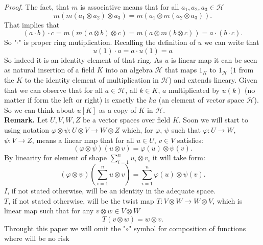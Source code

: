 \documentclass[a4paper]{article}
\begin{document}
\textit{Proof.} The fact, that $m$ is associative means that for all $a_1, a_2, a_3 \in \mathcal{H}$
\begin{equation*}
m(m(a_1 \otimes a_2) \otimes a_3) = m(a_1 \otimes m(a_2 \otimes a_3)).
\end{equation*}
That implies that
\begin{equation*}
(a\cdot b) \cdot c = m(m(a \otimes b) \otimes c) = m(a \otimes m(b \otimes c)) = a \cdot (b \cdot c).
\end{equation*}
So "$\cdot$" is proper ring mutiplication. Recalling the definition of $u$ we can write that
\begin{equation*}
u(1) \cdot a = a \cdot u(1) = a
\end{equation*}
So indeed it is an identity
element of that ring. As $u$ is linear map it can be seen as natural insertion of a field $K$ into an algebra
$\mathcal{H}$ that maps $1_K$ to $1_\mathcal{H}$ ($1$ from the $K$ to the identity element of multiplication
in $\mathcal{H}$) and extends lineary. Given that we can observe
that for all $a \in \mathcal{H}$, all $k \in K$, $a$ multiplicated by $u(k)$ (no matter if form the left
or right) is exactly the $ka$ (an element of vector space $\mathcal{H}$).
So we can think about $u[K]$ as a copy of $K$ in $\mathcal{H}$.
\\[8pt]
\textbf{Remark. } Let $U, V, W, Z$ be a vector spaces over field $K$.
Soon we will start to using notation
$\varphi \otimes \psi:U \otimes V \to W \otimes Z$ which, for
$\varphi$, $\psi$ such that $\varphi : U \to W$, $\psi : V \to Z$, means a linear map that
for all $u \in U$, $v \in V$ satisfies:
\begin{equation*}
(\varphi \otimes \psi)(u \otimes v) = \varphi(u) \otimes \psi(v).
\end{equation*}
By linearity for element of shape $\displaystyle\sum^n_{i=1} u_i \otimes v_i$ it will take form:
\begin{equation*}
(\varphi \otimes \psi)(\sum^n_{i = 1} u \otimes v) = \sum^n_{i = 1}\varphi(u) \otimes \psi(v).
\end{equation*}
$I$, if not stated otherwise, will be an identity in the adequate space. \\
$T$, if not stated otherwise, will
be the twist map $T:V \otimes W \to W\otimes V$, which is linear map such that for any $v \otimes w
\in V \otimes W$
\begin{equation*}
T(v \otimes w) = w\otimes v.
\end{equation*}
Throught this paper we will omit the "$\circ$" symbol for composition of functions where will be no risk 
\end{document}
